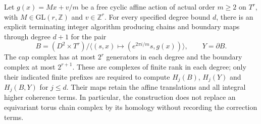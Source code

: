 \begin{theorem}\label{maps:src:F.2.33}


Let $g(x)=Mx+v/m$ be a free cyclic affine action of actual order
$m\geq2$ on $T^r$, with $M\in\mathrm{GL}(r,\mathbb Z)$ and
$v\in\mathbb Z^r$.  For every specified degree bound $d$, there is
an explicit terminating integer algorithm producing chains and
boundary maps through degree $d+1$ for the pair
\[
 B=(D^2\times T^r)/\langle(s,x)\mapsto
 (e^{2\pi i/m}s,g(x))\rangle,
 \qquad Y=\partial B.                                      \tag{F.CA1}\label{maps:eq:F.CA1}
\]
The cap complex has at most $2^r$ generators in each degree and
the boundary complex at most $2^{r+1}$.  These are complexes of
finite rank in each degree; only their indicated finite prefixes
are required to compute $H_j(B)$, $H_j(Y)$ and $H_j(B,Y)$ for
$j\leq d$.  Their maps retain the affine translations and all
integral higher coherence terms.  In particular, the construction
does not replace an equivariant torus chain complex by its
homology without recording the correction terms.

\end{theorem}
